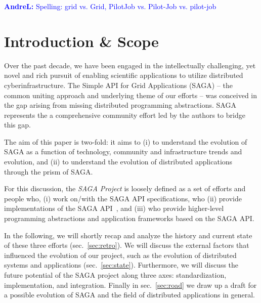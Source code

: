 \documentclass[]{article}
\newcommand{\I}[1]{\textit{#1}}
\newcommand{\B}[1]{\textbf{#1}}
\newcommand{\alnote}[1]{{\textcolor{blue}{    \B{AndreL:  } #1 }}}
\newcommand{\alnote}[1]{}
\begin{document}
\alnote{Spelling: grid vs. Grid, PilotJob vs. Pilot-Job vs. pilot-job}

\section{Introduction \& Scope }
\label{sec:intro}

Over the past decade, we have been engaged in the intellectually
challenging, yet novel and rich pursuit of enabling scientific
applications to utilize distributed cyberinfrastructure. The Simple
API for Grid Applications (SAGA) -- the common uniting approach and
underlying theme of our efforts -- was conceived in the gap arising
from missing distributed programming abstractions. SAGA represents the
a comprehensive community effort led by the authors to bridge this
gap.

The aim of this paper is two-fold: it aims to (i) to understand the
evolution of SAGA as a function of technology, community and
infrastructure trends and evolution, and (ii) to understand the
evolution of distributed applications through the prism of SAGA.

For this discussion, the \I{SAGA Project} is loosely defined as a set
of efforts and people who, (i) work on/with the SAGA API
specifications\cite{ogf-gfd-90}, who (ii) provide implementations of
the SAGA API~\cite{Kaiser:2006qp,jsaga,javasaga}, and (iii) who provide
higher-level programming abstractions and application frameworks based
on the SAGA API\cite{bigjob_cloudcom10}.

In the following, we will shortly recap and analyze the history and
current state of these three efforts (sec.~\ref{sec:retro}). We will
discuss the external factors that influenced the evolution of our
project, such as the evolution of distributed systems and applications
(sec.~\ref{sec:state}). Furthermore, we will discuss the future
potential of the SAGA project along three axes: standardization,
implementation, and integration. Finally in sec.~\ref{sec:road} we
draw up a draft for a possible evolution of SAGA and the field of
distributed applications in general.

 
\end{document}
